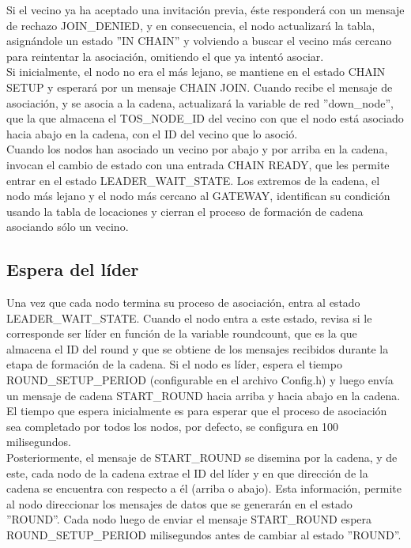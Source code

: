   Si el vecino ya ha aceptado una invitación previa, éste responderá con un mensaje de rechazo JOIN\_DENIED, y en consecuencia, el nodo actualizará la tabla, asignándole un estado ''IN CHAIN'' y volviendo a buscar el vecino más cercano para reintentar la asociación, omitiendo el que ya intentó asociar.\\
  
  Si inicialmente, el nodo no era el más lejano, se mantiene en el estado CHAIN SETUP y esperará por un mensaje CHAIN JOIN. Cuando recibe el mensaje de asociación, y se asocia a la cadena, actualizará la variable de red ''down\_node'', que la que almacena el TOS\_NODE\_ID del vecino con que el nodo está asociado hacia abajo en la cadena, con el ID del vecino que lo asoció.\\ 
  
  Cuando los nodos han asociado un vecino por abajo y por arriba en la cadena, invocan el cambio de estado con una entrada CHAIN READY, que les permite entrar en el estado LEADER\_WAIT\_STATE. Los extremos de la cadena, el nodo más lejano y el nodo más cercano al GATEWAY, identifican su condición usando la tabla de locaciones y cierran el proceso de formación de cadena asociando sólo un vecino.
  
 \subsection{Espera del líder}
 
Una vez que cada nodo termina su proceso de asociación, entra al estado LEADER\_WAIT\_STATE. Cuando el nodo entra a este estado, revisa si le corresponde ser líder en función de la variable roundcount, que es la que almacena el ID del round y que se obtiene de los mensajes recibidos durante la etapa de formación de la cadena. Si el nodo es líder, espera el tiempo ROUND\_SETUP\_PERIOD (configurable en el archivo Config.h) y luego envía un mensaje de cadena START\_ROUND hacia arriba y hacia abajo en la cadena. El tiempo que espera inicialmente es para esperar que el proceso de asociación sea completado por todos los nodos, por defecto, se configura en 100 milisegundos.\\

Posteriormente, el mensaje de START\_ROUND se disemina por la cadena, y de este, cada nodo de la cadena extrae el ID del líder y en que dirección de la cadena se encuentra con respecto a él (arriba o abajo). Esta información, permite al nodo direccionar los mensajes de datos que se generarán en el estado ''ROUND''. Cada nodo luego de enviar el mensaje START\_ROUND espera ROUND\_SETUP\_PERIOD milisegundos antes de cambiar al estado ''ROUND''.

